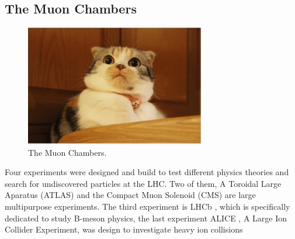 \subsection{The Muon Chambers}
\begin{figure}[!h]
  \centering
  \includegraphics[width=0.7\textwidth]{../images/ch2/9}
  \caption[The Muon Chambers]{The Muon Chambers.}\label{fig:cms_layout}
\end{figure}
Four experiments were designed and build to test different physics theories and search for undiscovered particles at the LHC. Two of them, A Toroidal Large Aparatus (ATLAS)\cite{atlas} and the Compact Muon Solenoid (CMS)\cite{cms_doc} are large multipurpose experiments. The third experiment is LHCb \cite{lhcb}, which is specifically dedicated to study B-meson physics, the last experiment ALICE \cite{alice}, A Large Ion Collider Experiment, was design to investigate heavy ion collisions



